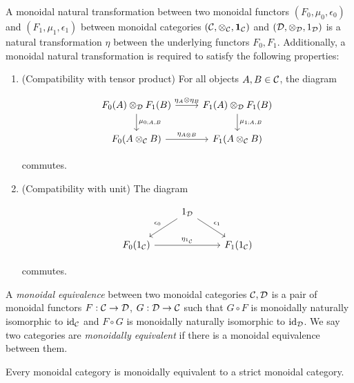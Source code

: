 \begin{defn} A monoidal natural transformation between two monoidal functors $(F_0,\mu_0,\epsilon_0)$ and $(F_1,\mu_1,\epsilon_1)$ between monoidal categories $({\mathcal C},\otimes_{{\mathcal C}},{\mathbf 1}_{{\mathcal C}})$ and $({\mathcal D},\otimes_{{\mathcal D}},1_{{\mathcal D}})$ is a natural transformation $\eta$ between the underlying functors $F_0,F_1$. Additionally, a monoidal natural transformation is required to satisfy the following properties:

\begin{enumerate}
\item (Compatibility with tensor product) For all objects $A,B\in {\mathcal C}$, the diagram

\[\begin{tikzcd}
	{F_0(A)\otimes_{\cD}F_1(B)} & {F_1(A)\otimes_{\cD}F_1(B)} \\
	{F_0(A\otimes_{\cC} B)} & {F_1(A\otimes_{\cC} B)}
	\arrow["{\mu_{0;A,B}}", from=1-1, to=2-1]
	\arrow["{\mu_{1;A,B}}", from=1-2, to=2-2]
	\arrow["{\eta_A\otimes \eta_B}", from=1-1, to=1-2]
	\arrow["{\eta_{A\otimes B}}", from=2-1, to=2-2]
\end{tikzcd}\]

commutes.

\item (Compatibility with unit) The diagram

\[\begin{tikzcd}
	& {1_{\cD}} \\
	{F_0(1_{\cC})} && {F_1(1_{\cC})}
	\arrow["{\eta_{1_{\cC}}}", from=2-1, to=2-3]
	\arrow["{\epsilon_0}"', from=1-2, to=2-1]
	\arrow["{\epsilon_1}", from=1-2, to=2-3]
\end{tikzcd}\]

commutes.
\end{enumerate}
\end{defn}

\begin{defn}
A {\em monoidal equivalence} between two monoidal categories ${\mathcal C},{\mathcal D}$ is a pair of monoidal functors $F:{\mathcal C}\to {\mathcal D}$, $G:{\mathcal D}\to {\mathcal C}$ such that $G\circ F$ is monoidally naturally isomorphic to $\operatorname{id}_{{\mathcal C}}$ and $F\circ G$ is monoidally naturally isomorphic to $\operatorname{id}_{{\mathcal D}}$. We say two categories are {\em monoidally equivalent} if there is a monoidal equivalence between them.
\end{defn}

\begin{thrm}\label{maclane-coherence-theorem} Every monoidal category is monoidally equivalent to a strict monoidal category.
\end{thrm}

